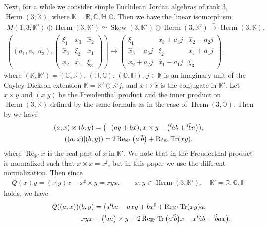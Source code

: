 \documentclass[pdftex]{sigma}
\numberwithin{equation}{section}
\newcommand{\BR}{\mathbb{R}}
\newcommand{\BC}{\mathbb{C}}
\newcommand{\BH}{\mathbb{H}}
\newcommand{\BK}{\mathbb{K}}
\newcommand{\BO}{\mathbb{O}}
\newcommand{\Tr}{\operatorname{Tr}}
\newcommand{\Skew}{\operatorname{Skew}}
\newcommand{\Herm}{\operatorname{Herm}}
\renewcommand{\Re}{\operatorname{Re}}
\begin{document}
Next, for a while we consider simple Euclidean Jordan algebras of rank 3, $\Herm(3,\BK)$, where $\BK=\BR, \BC, \BH, \BO$.
Then we have the linear isomorphism
\begin{gather*}
M(1,3;\BK')\oplus\Herm(3,\BK')\simeq \Skew(3,\BK')\oplus\Herm(3,\BK')\xrightarrow{\sim}\Herm(3,\BK), \\
\left((a_1,a_2,a_3),\begin{pmatrix}\xi_1&x_3&\hat{x}_2\\\hat{x}_3&\xi_2&x_1\\x_2&\hat{x}_1&\xi_3\end{pmatrix}\right)
\mapsto \begin{pmatrix}\xi_1&x_3+a_3j&\hat{x}_2-a_2j\\\hat{x}_3-a_3j&\xi_2&x_1+a_1j\\x_2+a_2j&\hat{x}_1-a_1j&\xi_3\end{pmatrix},
\end{gather*}
where $(\BK,\BK')=(\BC,\BR)$, $(\BH,\BC)$, $(\BO,\BH)$, $j\in \BK$ is an imaginary unit of the Cayley-Dickson extension $\BK=\BK'\oplus\BK' j$,
and $x\mapsto \hat{x}$ is the conjugate in $\BK'$.
Let $x\times y$ and $(x|y)$ be the Freudenthal product and the inner product on $\Herm(3,\BK)$ defined by the same formula
as in the case of $\Herm(3,\BO)$.
Then by \cite{Y1,Y2} we have
\begin{gather*}
(a,x)\times (b,y)=\big({-}(ay+bx),x\times y-\big({}^t\hspace{-1pt}\hat{a}b+{}^t\hspace{-1pt}\hat{b}a\big)\big),\\
((a,x)|(b,y))=2\Re_{\BK'}\big(a{}^t\hspace{-1pt}\hat{b}\big)+\Re_{\BK'}\Tr(xy),
\end{gather*}
where $\Re_{\BK'} x$ is the real part of $x$ in $\BK'$.
We note that in \cite{Y1,Y2} the Freudenthal product is normalized such that $x\times x=x^\sharp$,
but in this paper we use the different normalization.
Then since
\begin{gather}\label{Freudenthal}
Q(x)y=(x|y)x-x^\sharp\times y=xyx, \qquad x,y\in\Herm(3,\BK'),\quad \BK'=\BR,\BC,\BH
\end{gather}
holds, we have
\begin{gather*}
Q((a,x))(b,y)=\bigl(a{}^t\hspace{-1pt}ba-axy+bx^\sharp+\Re_{\BK'}\Tr(xy)a,\\
\hphantom{Q((a,x))(b,y)=\bigl(}{} xyx+\big({}^t\hspace{-1pt}aa\big)\times y+2\Re_{\BK'}\Tr\big(a{}^t\hspace{-1pt}\hat{b}\big)x-x{}^t\hspace{-1pt}\hat{a}b-{}^t\hspace{-1pt}\hat{b}ax\bigr),
\end{gather*}
\end{document}
